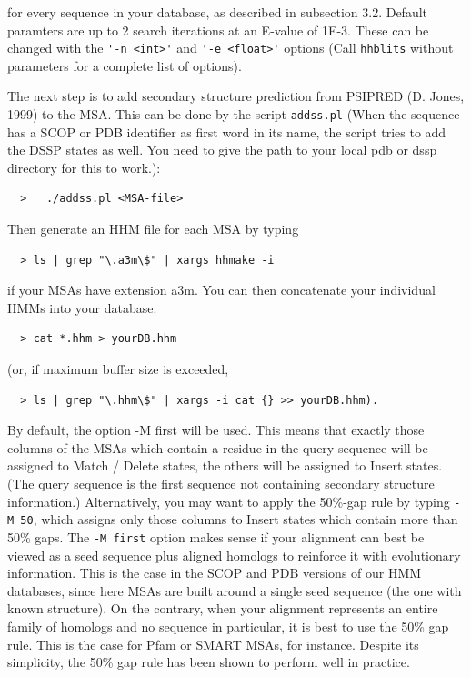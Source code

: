 \documentclass[11pt,a4paper]{article}
\begin{document}
for every sequence in your database, as described in subsection 3.2. Default paramters 
are up to 2 search iterations at an E-value of 1E-3. These can be changed with the 
\verb`'-n <int>'` and \verb`'-e <float>'` options (Call \verb`hhblits` without parameters for a 
complete list of options). 

The next step is to add secondary structure prediction from PSIPRED (D. Jones, 1999) to the
MSA. This can be done by the script \verb`addss.pl` (When the sequence has a SCOP or PDB identifier as first word 
in its name, the script tries to add the DSSP states as well. You need to give the 
path to your local pdb or dssp directory for this to work.):

\begin{verbatim}
  >   ./addss.pl <MSA-file>
\end{verbatim}

Then generate an HHM file for each MSA by typing
\begin{verbatim}
  > ls | grep "\.a3m\$" | xargs hhmake -i 
\end{verbatim}

if your MSAs have extension a3m. You can then concatenate your individual HMMs
into your database:
\begin{verbatim}
  > cat *.hhm > yourDB.hhm
\end{verbatim}
(or, if maximum buffer size is exceeded, 
\begin{verbatim}
  > ls | grep "\.hhm\$" | xargs -i cat {} >> yourDB.hhm).
\end{verbatim}

By default, the option -M first will be used. This means that exactly those columns of 
the MSAs which contain a residue in the query sequence will be assigned to Match 
/ Delete states, the others will be assigned to Insert states. (The query sequence is 
the first sequence not containing secondary structure information.) Alternatively, you 
may want to apply the 50\%-gap rule by typing \verb`-M 50`, which assigns only those columns 
to Insert states which contain more than 50\% gaps. The \verb`-M first` option makes sense 
if your alignment can best be viewed as a seed sequence plus aligned homologs to 
reinforce it with evolutionary information. This is the case in the SCOP and PDB 
versions of our HMM databases, since here MSAs are built around a single seed 
sequence (the one with known structure). On the contrary, when your alignment 
represents an entire family of homologs and no sequence in particular, it is best to 
use the 50\% gap rule. This is the case for Pfam or SMART MSAs, for instance. 
Despite its simplicity, the 50\% gap rule has been shown to perform well in practice.
\end{document}
